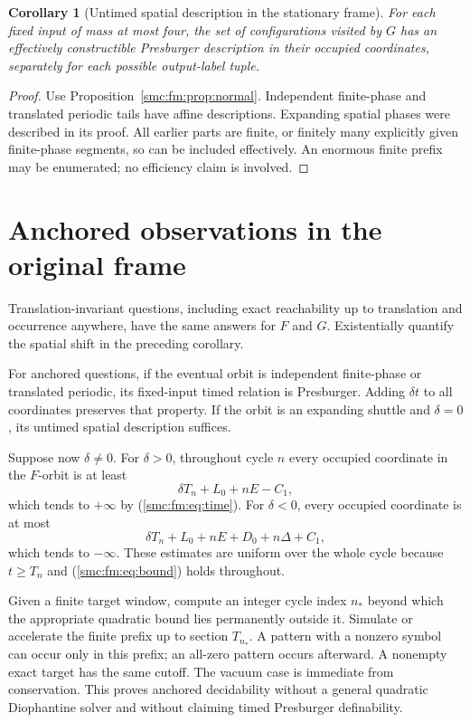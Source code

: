 \documentclass[11pt,letterpaper]{article}
\numberwithin{equation}{section}
\newtheorem{corollary}[theorem]{Corollary}
\theoremstyle{definition}
\theoremstyle{remark}
\begin{document}
\begin{corollary}[Untimed spatial description in the stationary frame]\label{smc:fm:cor:spatial}
For each fixed input of mass at most four, the set of configurations visited
by $G$ has an effectively constructible Presburger description in their
occupied coordinates, separately for each possible output-label tuple.
\end{corollary}
\begin{proof}
Use Proposition~\ref{smc:fm:prop:normal}. Independent finite-phase and translated
periodic tails have affine descriptions. Expanding spatial phases were described
in its proof. All earlier parts are finite, or finitely many explicitly given
finite-phase segments, so can be included effectively. An enormous finite prefix
may be enumerated; no efficiency claim is involved.
\end{proof}

\section{Anchored observations in the original frame}\label{smc:fm:sec:anchored}
Translation-invariant questions, including exact reachability up to translation
and occurrence anywhere, have the same answers for $F$ and $G$. Existentially
quantify the spatial shift in the preceding corollary.

For anchored questions, if the eventual orbit is independent finite-phase or
translated periodic, its fixed-input timed relation is Presburger. Adding
$\delta t$ to all coordinates preserves that property. If the orbit is an
expanding shuttle and $\delta=0$, its untimed spatial description suffices.

Suppose now $\delta\ne0$. For $\delta>0$, throughout cycle $n$ every occupied
coordinate in the $F$-orbit is at least
\[
     \delta T_n+L_0+nE-C_1,
\]
which tends to $+\infty$ by (\ref{smc:fm:eq:time}). For $\delta<0$, every occupied
coordinate is at most
\[
     \delta T_n+L_0+nE+D_0+n\Delta+C_1,
\]
which tends to $-\infty$. These estimates are uniform over the whole cycle
because $t\ge T_n$ and (\ref{smc:fm:eq:bound}) holds throughout.

Given a finite target window, compute an integer cycle index $n_*$ beyond which the
appropriate quadratic bound lies permanently outside it. Simulate or accelerate
the finite prefix up to section $T_{n_*}$. A pattern with a nonzero symbol can occur
only in this prefix; an all-zero pattern occurs afterward. A nonempty exact
target has the same cutoff. The vacuum case is immediate from conservation.
This proves anchored decidability without a general quadratic Diophantine solver
and without claiming timed Presburger definability.
\end{document}
